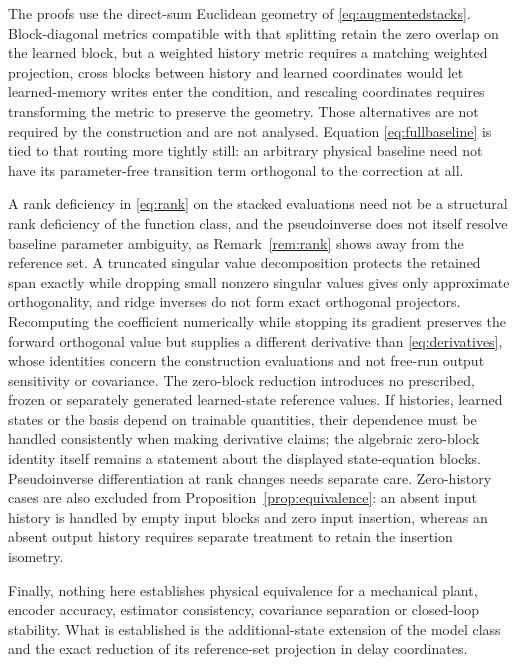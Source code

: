 \documentclass[11pt,a4paper]{article}
\theoremstyle{remark}
\begin{document}
The proofs use the direct-sum Euclidean geometry of \eqref{eq:augmentedstacks}. Block-diagonal
metrics compatible with that splitting retain the zero overlap on the learned block, but a
weighted history metric requires a matching weighted projection, cross blocks between history and
learned coordinates would let learned-memory writes enter the condition, and rescaling coordinates
requires transforming the metric to preserve the geometry. Those alternatives are not required by
the construction and are not analysed. Equation \eqref{eq:fullbaseline} is tied to that routing
more tightly still: an arbitrary physical baseline need not have its parameter-free transition
term orthogonal to the correction at all.

A rank deficiency in \eqref{eq:rank} on the stacked evaluations need not be a structural rank deficiency
of the function class, and the pseudoinverse does not itself resolve baseline parameter ambiguity,
as Remark~\ref{rem:rank} shows away from the reference set. A truncated singular value
decomposition protects the retained span exactly while dropping small nonzero singular values
gives only approximate orthogonality, and ridge inverses do not form exact orthogonal projectors.
Recomputing the coefficient numerically while stopping its gradient preserves the forward
orthogonal value but supplies a different derivative than \eqref{eq:derivatives}, whose identities
concern the construction evaluations and not free-run output sensitivity or covariance. The
zero-block reduction introduces no prescribed, frozen or separately generated learned-state
reference values. If histories, learned states or the basis depend on trainable quantities, their
dependence must be handled consistently when making derivative claims; the algebraic zero-block
identity itself remains a statement about the displayed state-equation blocks. Pseudoinverse
differentiation at rank changes needs separate care. Zero-history cases are also excluded from
Proposition~\ref{prop:equivalence}: an absent input history is handled by empty input blocks and
zero input insertion, whereas an absent output history requires separate treatment to retain the
insertion isometry.

Finally, nothing here establishes physical equivalence for a mechanical plant, encoder accuracy,
estimator consistency, covariance separation or closed-loop stability. What is established is the
additional-state extension of the model class and the exact reduction of its reference-set
projection in delay coordinates.
\end{document}

